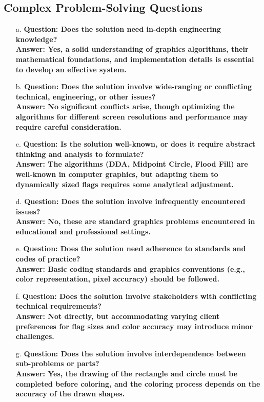 \documentclass[12pt]{article}
\begin{document}
\subsection*{Complex Problem-Solving Questions}
\begin{enumerate}
    \item[a.] \textbf{Question: Does the solution need in-depth engineering knowledge?} \\
        \textbf{Answer: Yes, a solid understanding of graphics algorithms, their mathematical foundations, and implementation details is essential to develop an effective system.}
    \item[b.] \textbf{Question: Does the solution involve wide-ranging or conflicting technical, engineering, or other issues?} \\
        \textbf{Answer: No significant conflicts arise, though optimizing the algorithms for different screen resolutions and performance may require careful consideration.}
    \item[c.] \textbf{Question: Is the solution well-known, or does it require abstract thinking and analysis to formulate?} \\
        \textbf{Answer: The algorithms (DDA, Midpoint Circle, Flood Fill) are well-known in computer graphics, but adapting them to dynamically sized flags requires some analytical adjustment.}
    \item[d.] \textbf{Question: Does the solution involve infrequently encountered issues?} \\
        \textbf{Answer: No, these are standard graphics problems encountered in educational and professional settings.}
    \item[e.] \textbf{Question: Does the solution need adherence to standards and codes of practice?} \\
        \textbf{Answer: Basic coding standards and graphics conventions (e.g., color representation, pixel accuracy) should be followed.}
    \item[f.] \textbf{Question: Does the solution involve stakeholders with conflicting technical requirements?} \\
        \textbf{Answer: Not directly, but accommodating varying client preferences for flag sizes and color accuracy may introduce minor challenges.}
    \item[g.] \textbf{Question: Does the solution involve interdependence between sub-problems or parts?} \\
        \textbf{Answer: Yes, the drawing of the rectangle and circle must be completed before coloring, and the coloring process depends on the accuracy of the drawn shapes.}
\end{enumerate}
\end{document}
